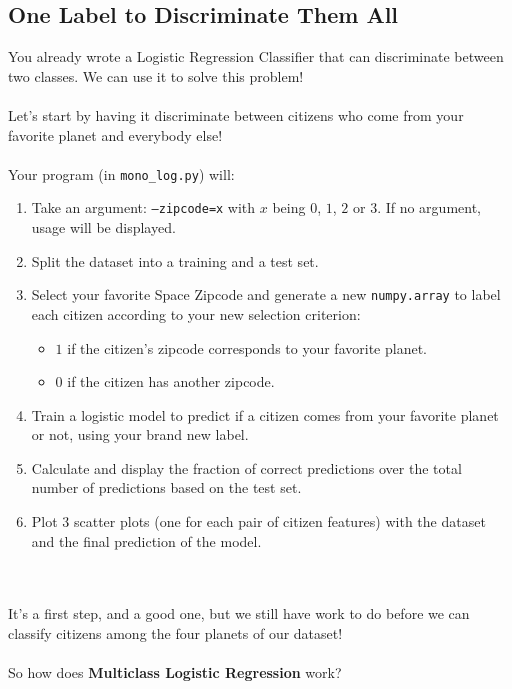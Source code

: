 \subsection*{One Label to Discriminate Them All}
You already wrote a Logistic Regression Classifier that can discriminate between two classes. We can use it 
to solve this problem!\\
\\
Let's start by having it discriminate between citizens who come from your favorite planet and everybody else!\\
\\
Your program (in \texttt{mono\_log.py}) will:
\begin{enumerate}
  \item Take an argument: \texttt{--zipcode=x} with $x$ being $0$, $1$, $2$ or $3$.
        If no argument, usage will be displayed.
  \item Split the dataset into a training and a test set.
  \item Select your favorite Space Zipcode and generate a new \texttt{numpy.array} to label each citizen according to your new selection criterion:
  \begin{itemize}
    \item $1$ if the citizen's zipcode corresponds to your favorite planet.
    \item $0$ if the citizen has another zipcode.
  \end{itemize}
  \item Train a logistic model to predict if a citizen comes from your favorite planet or not, using your brand new label.
  \item Calculate and display the fraction of correct predictions over the total number of predictions based on the test set.
  \item Plot 3 scatter plots (one for each pair of citizen features) with the dataset and the final prediction of the model.
\end{enumerate}
\\
\\
It's a first step, and a good one, but we still have work to do before we can classify citizens 
among the four planets of our dataset!\\
\\
So how does \textbf{Multiclass Logistic Regression} work?\\
